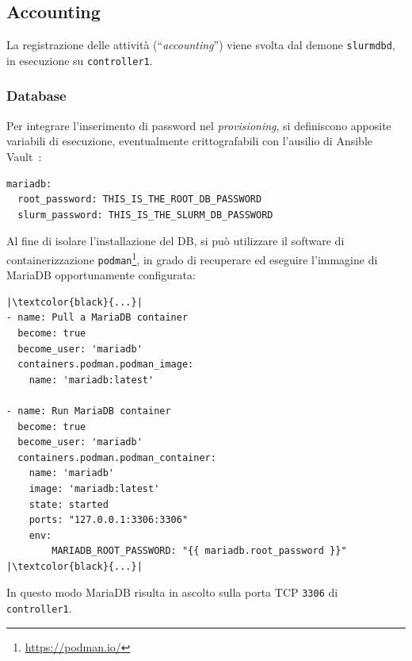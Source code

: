 \documentclass[12pt,a4paper,twoside,openright]{book}
\begin{document}
\subsection{Accounting}
La registrazione delle attività (``\textit{accounting}'') viene svolta dal demone \texttt{slurmdbd}, in esecuzione su \texttt{controller1}.

\subsubsection{Database}
Per integrare l'inserimento di password nel \textit{provisioning}, si definiscono apposite variabili di esecuzione, eventualmente crittografabili con l'ausilio di Ansible Vault~\cite{ansibledoc}:
\begin{verbatim}
mariadb:
  root_password: THIS_IS_THE_ROOT_DB_PASSWORD
  slurm_password: THIS_IS_THE_SLURM_DB_PASSWORD
\end{verbatim}
Al fine di isolare l'installazione del \ac{DB}, si può utilizzare il software di containerizzazione \texttt{podman}\footnote{\url{https://podman.io/}}, in grado di recuperare ed eseguire l'immagine di Maria\acs{DB} opportunamente configurata:
\begin{verbatim}
|\textcolor{black}{...}|
- name: Pull a MariaDB container
  become: true
  become_user: 'mariadb'
  containers.podman.podman_image:
    name: 'mariadb:latest'

- name: Run MariaDB container
  become: true
  become_user: 'mariadb'
  containers.podman.podman_container:
    name: 'mariadb'
    image: 'mariadb:latest'
    state: started
    ports: "127.0.0.1:3306:3306"
    env:
        MARIADB_ROOT_PASSWORD: "{{ mariadb.root_password }}"
|\textcolor{black}{...}|
\end{verbatim}
In questo modo Maria\acs{DB} risulta in ascolto sulla porta \ac{TCP} \texttt{3306} di \texttt{controller1}.
\end{document}
